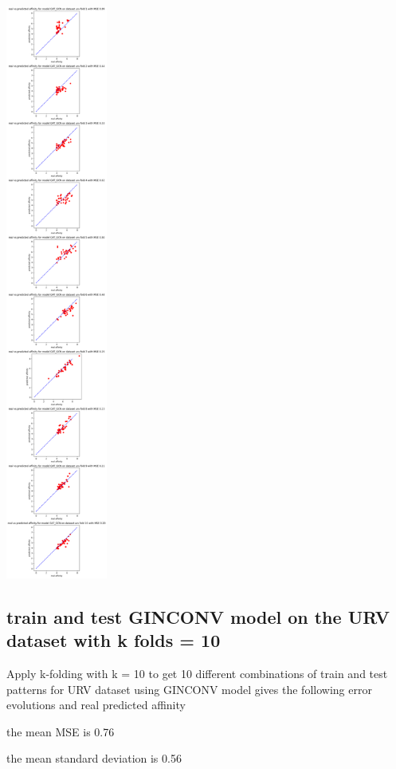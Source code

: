 \documentclass[11pt, a4paper]{article}
\begin{document}
    \begin{center}
        \includegraphics[width=0.25\textwidth]{GATGCN_folds10predictions.png}
    \end{center}

    \subsection{train and test GINCONV model on the URV dataset with k folds = 10}
    Apply k-folding with k = 10 to get 10 different combinations of train and test patterns for URV dataset using GINCONV model gives the following error evolutions and real predicted affinity
    
    the mean MSE is 0.76

    the mean standard deviation is 0.56
\end{document}
